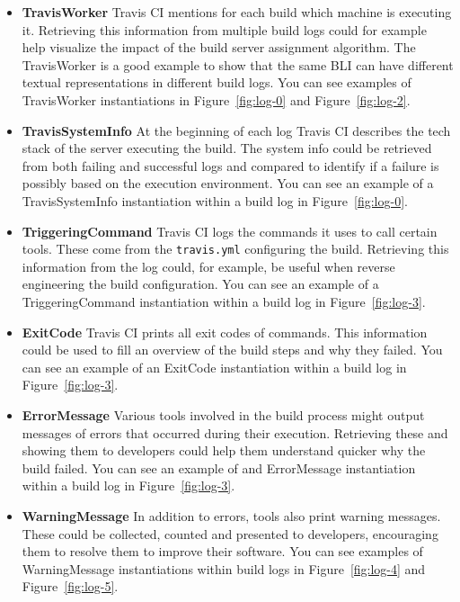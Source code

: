 \documentclass[\myrootdir/main.tex]{subfiles}
\begin{document}
\begin{itemize}
	\item \textbf{TravisWorker} Travis CI mentions for each build which machine is executing it.
	      Retrieving this information from multiple build logs could for example help visualize the impact of the build server assignment algorithm.
	      The TravisWorker is a good example to show that the same BLI can have different textual representations in different build logs.
	      You can see examples of TravisWorker instantiations in Figure~\ref{fig:log-0} and Figure~\ref{fig:log-2}.

	\item \textbf{TravisSystemInfo} At the beginning of each log Travis CI describes the tech stack of the server executing the build.
	      The system info could be retrieved from both failing and successful logs and compared to identify if a failure is possibly based on the execution environment.
	      You can see an example of a TravisSystemInfo instantiation within a build log in Figure~\ref{fig:log-0}.

	\item \textbf{TriggeringCommand} Travis CI logs the commands it uses to call certain tools.
	      These come from the \texttt{travis.yml} configuring the build.
	      Retrieving this information from the log could, for example, be useful when reverse engineering the build configuration.
	      You can see an example of a TriggeringCommand instantiation within a build log in Figure~\ref{fig:log-3}.

	\item \textbf{ExitCode} Travis CI prints all exit codes of commands.
	      This information could be used to fill an overview of the build steps and why they failed.
	      You can see an example of an ExitCode instantiation within a build log in Figure~\ref{fig:log-3}.

	\item \textbf{ErrorMessage} Various tools involved in the build process might output messages of errors that occurred during their execution.
	      Retrieving these and showing them to developers could help them understand quicker why the build failed.
	      You can see an example of and ErrorMessage instantiation within a build log in Figure~\ref{fig:log-3}.

	\item \textbf{WarningMessage} In addition to errors, tools also print warning messages.
	      These could be collected, counted and presented to developers, encouraging them to resolve them to improve their software.
	      You can see examples of WarningMessage instantiations within build logs in Figure~\ref{fig:log-4} and Figure~\ref{fig:log-5}.

\end{itemize}
\end{document}
